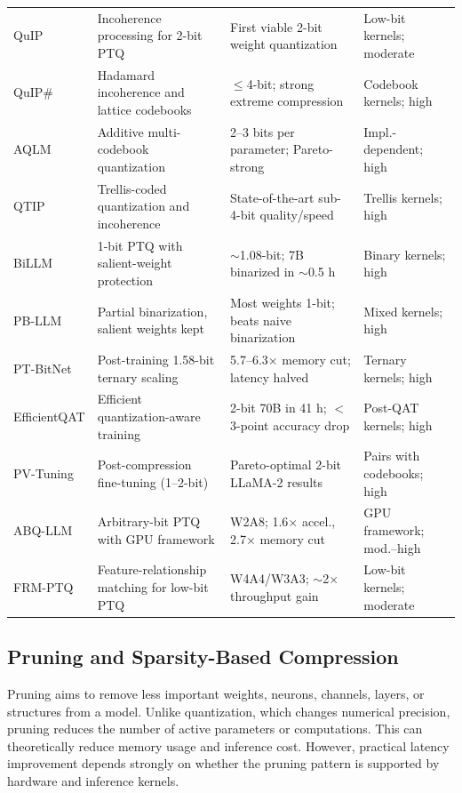 \documentclass[
11pt, %
english, %
singlespacing, %
headsepline, %
]{MastersDoctoralThesis} %
\begin{document}
\begin{table}[htbp]
\begin{tabular}{p{}p{}p{}p{}}
QuIP \cite{chee2023quip} & Incoherence processing for 2-bit PTQ & First viable 2-bit weight quantization & Low-bit kernels; moderate \\
QuIP\# \cite{tseng2024quipsharp} & Hadamard incoherence and lattice codebooks & $\leq$4-bit; strong extreme compression & Codebook kernels; high \\
AQLM \cite{egiazarian2024aqlm} & Additive multi-codebook quantization & 2--3 bits per parameter; Pareto-strong & Impl.-dependent; high \\
QTIP \cite{tseng2024qtip} & Trellis-coded quantization and incoherence & State-of-the-art sub-4-bit quality/speed & Trellis kernels; high \\
BiLLM \cite{huang2024billm} & 1-bit PTQ with salient-weight protection & $\sim$1.08-bit; 7B binarized in $\sim$0.5 h & Binary kernels; high \\
PB-LLM \cite{shang2023pbllm} & Partial binarization, salient weights kept & Most weights 1-bit; beats naive binarization & Mixed kernels; high \\
PT-BitNet \cite{survey2025ptbitnet} & Post-training 1.58-bit ternary scaling & 5.7--6.3$\times$ memory cut; latency halved & Ternary kernels; high \\
EfficientQAT \cite{chen2025efficientqat} & Efficient quantization-aware training & 2-bit 70B in 41 h; $<$3-point accuracy drop & Post-QAT kernels; high \\
PV-Tuning \cite{malinovskii2024pvtuning} & Post-compression fine-tuning (1--2-bit) & Pareto-optimal 2-bit LLaMA-2 results & Pairs with codebooks; high \\
ABQ-LLM \cite{zeng2025abqllm} & Arbitrary-bit PTQ with GPU framework & W2A8; 1.6$\times$ accel., 2.7$\times$ memory cut & GPU framework; mod.--high \\
FRM-PTQ \cite{survey2026frmptq} & Feature-relationship matching for low-bit PTQ & W4A4/W3A3; $\sim$2$\times$ throughput gain & Low-bit kernels; moderate \\
\hline
\end{tabular}
\end{table}

\subsection{Pruning and Sparsity-Based Compression}

Pruning aims to remove less important weights, neurons, channels, layers, or structures from a model. Unlike quantization, which changes numerical precision, pruning reduces the number of active parameters or computations. This can theoretically reduce memory usage and inference cost. However, practical latency improvement depends strongly on whether the pruning pattern is supported by hardware and inference kernels.
\end{document}
